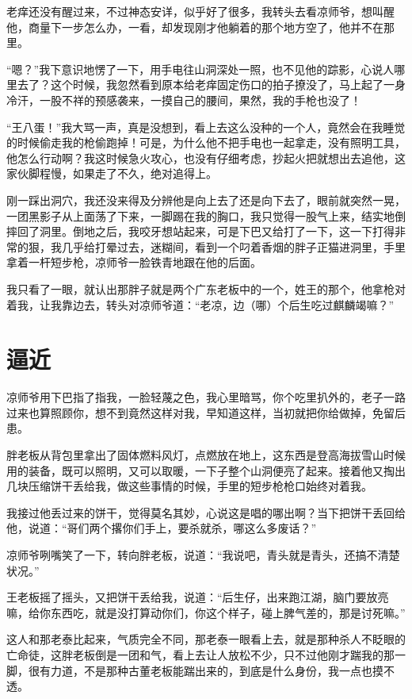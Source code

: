 老痒还没有醒过来，不过神态安详，似乎好了很多，我转头去看凉师爷，想叫醒他，商量下一步怎么办，一看，却发现刚才他躺着的那个地方空了，他并不在那里。

“嗯？”我下意识地愣了一下，用手电往山洞深处一照，也不见他的踪影，心说人哪里去了？这个时候，我忽然看到原本给老痒固定伤口的拍子撩没了，马上起了一身冷汗，一股不祥的预感袭来，一摸自己的腰间，果然，我的手枪也没了！

“王八蛋！”我大骂一声，真是没想到，看上去这么没种的一个人，竟然会在我睡觉的时候偷走我的枪偷跑掉！可是，为什么他不把手电也一起拿走，没有照明工具，他怎么行动啊？我这时候急火攻心，也没有仔细考虑，抄起火把就想出去追他，这家伙脚程慢，如果走了不久，绝对追得上。

刚一踩出洞穴，我还没来得及分辨他是向上去了还是向下去了，眼前就突然一晃，一团黑影子从上面荡了下来，一脚踢在我的胸口，我只觉得一股气上来，结实地倒摔回了洞里。倒地之后，我咬牙想站起来，可是下巴又给打了一下，这一下打得非常的狠，我几乎给打晕过去，迷糊间，看到一个叼着香烟的胖子正猫进洞里，手里拿着一杆短步枪，凉师爷一脸铁青地跟在他的后面。

我只看了一眼，就认出那胖子就是两个广东老板中的一个，姓王的那个，他拿枪对着我，让我靠边去，转头对凉师爷道：“老凉，边（哪）个后生吃过麒麟竭嘛？”

\chapter{逼近}

凉师爷用下巴指了指我，一脸轻蔑之色，我心里暗骂，你个吃里扒外的，老子一路过来也算照顾你，想不到竟然这样对我，早知道这样，当初就把你给做掉，免留后患。

胖老板从背包里拿出了固体燃料风灯，点燃放在地上，这东西是登高海拔雪山时候用的装备，既可以照明，又可以取暖，一下子整个山洞便亮了起来。接着他又掏出几块压缩饼干丢给我，做这些事情的时候，手里的短步枪枪口始终对着我。

我接过他丢过来的饼干，觉得莫名其妙，心说这是唱的哪出啊？当下把饼干丢回给他，说道：“哥们两个撂你们手上，要杀就杀，哪这么多废话？”

凉师爷咧嘴笑了一下，转向胖老板，说道：“我说吧，青头就是青头，还搞不清楚状况。”

王老板摇了摇头，又把饼干丢给我，说道：“后生仔，出来跑江湖，脑门要放亮嘛，给你东西吃，就是没打算动你们，你这个样子，碰上脾气差的，那是讨死嘛。”

这人和那老泰比起来，气质完全不同，那老泰一眼看上去，就是那种杀人不眨眼的亡命徒，这胖老板倒是一团和气，看上去让人放松不少，只不过他刚才踹我的那一脚，很有力道，不是那种古董老板能踹出来的，到底是什么身份，我一点也摸不透。

